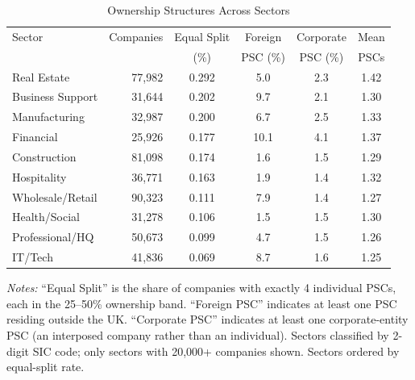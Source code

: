 \begin{table}[t]
\centering
\begin{threeparttable}
\caption{Ownership Structures Across Sectors}
\label{tab:sector}
\begin{tabular}{lrcccc}
\toprule
Sector & Companies & Equal Split & Foreign & Corporate & Mean \\
 & & (\%) & PSC (\%) & PSC (\%) & PSCs \\
\midrule
Real Estate & 77,982 & 0.292 & 5.0 & 2.3 & 1.42 \\
Business Support & 31,644 & 0.202 & 9.7 & 2.1 & 1.30 \\
Manufacturing & 32,987 & 0.200 & 6.7 & 2.5 & 1.33 \\
Financial & 25,926 & 0.177 & 10.1 & 4.1 & 1.37 \\
Construction & 81,098 & 0.174 & 1.6 & 1.5 & 1.29 \\
Hospitality & 36,771 & 0.163 & 1.9 & 1.4 & 1.32 \\
Wholesale/Retail & 90,323 & 0.111 & 7.9 & 1.4 & 1.27 \\
Health/Social & 31,278 & 0.106 & 1.5 & 1.5 & 1.30 \\
Professional/HQ & 50,673 & 0.099 & 4.7 & 1.5 & 1.26 \\
IT/Tech & 41,836 & 0.069 & 8.7 & 1.6 & 1.25 \\
\bottomrule
\end{tabular}
\begin{tablenotes}[flushleft]\small
\item \textit{Notes:} ``Equal Split'' is the share of companies with exactly 4 individual PSCs, each in the 25--50\% ownership band. ``Foreign PSC'' indicates at least one PSC residing outside the UK. ``Corporate PSC'' indicates at least one corporate-entity PSC (an interposed company rather than an individual). Sectors classified by 2-digit SIC code; only sectors with 20,000+ companies shown. Sectors ordered by equal-split rate.
\end{tablenotes}
\end{threeparttable}
\end{table}
